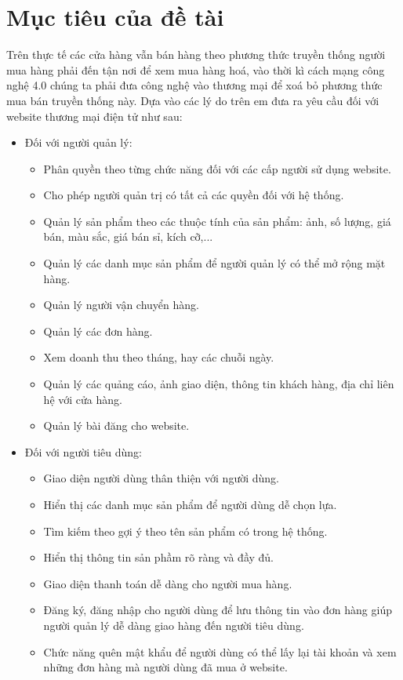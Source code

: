 \section{Mục tiêu của đề tài}
Trên thực tế các cửa hàng vẫn bán hàng theo phương thức truyền thống người mua hàng phải đến tận nơi để xem mua hàng hoá, vào thời kì cách mạng công nghệ 4.0 chúng ta phải đưa công nghệ vào thương mại để xoá bỏ phương thức mua bán truyền thống này. Dựa vào các lý do trên em đưa ra yêu cầu đối với website thương mại điện tử như sau:
\begin{itemize}
\item Đối với người quản lý:
\begin{itemize}
\item Phân quyền theo từng chức năng đối với các cấp người sử dụng website.
\item Cho phép người quản trị có tất cả các quyền đối với hệ thống.
\item Quản lý sản phẩm theo các thuộc tính của sản phẩm: ảnh, số lượng, giá bán, màu sắc, giá bán sỉ, kích cỡ,...
\item Quản lý các danh mục sản phẩm để người quản lý có thể mở rộng mặt hàng.
\item Quản lý người vận chuyển hàng.
\item Quản lý các đơn hàng.
\item Xem doanh thu theo tháng, hay các chuỗi ngày.
\item Quản lý các quảng cáo, ảnh giao diện, thông tin khách hàng, địa chỉ liên hệ với cửa hàng.
\item Quản lý bài đăng cho website.
\end{itemize}
\item Đối với người tiêu dùng:
\begin{itemize}
\item Giao diện người dùng thân thiện với người dùng.
\item Hiển thị các danh mục sản phẩm để người dùng dễ chọn lựa.
\item Tìm kiếm theo gợi ý theo tên sản phẩm có trong hệ thống.
\item Hiển thị thông tin sản phầm rõ ràng và đầy đủ.
\item Giao diện thanh toán dễ dàng cho người mua hàng.
\item Đăng ký, đăng nhập cho người dùng để lưu thông tin vào đơn hàng giúp người quản lý dễ dàng giao hàng đến người tiêu dùng.
\item Chức năng quên mật khẩu để người dùng có thể lấy lại tài khoản và xem những đơn hàng mà người dùng đã mua ở website.
\end{itemize}
\end{itemize}
